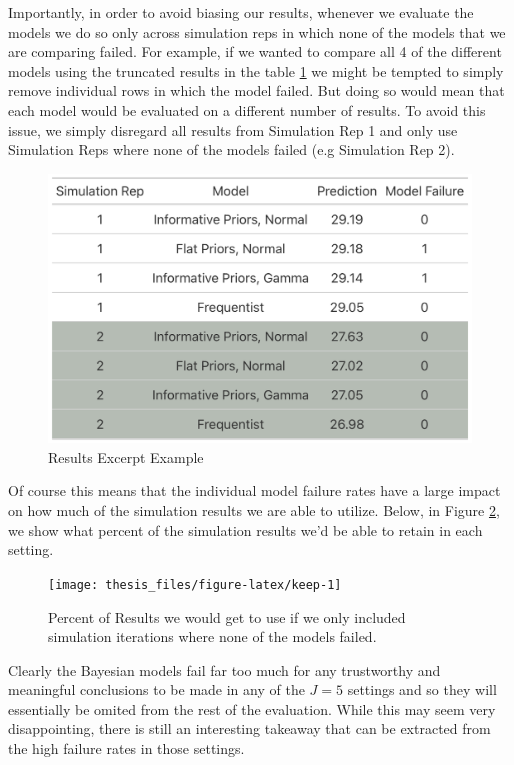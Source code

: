 \documentclass[12pt,twoside]{reedthesis}
\begin{document}
Importantly, in order to avoid biasing our results, whenever we evaluate the models we do so only across simulation reps in which none of the models that we are comparing failed. For example, if we wanted to compare all 4 of the different models using the truncated results in the table \ref{fig:tbl} we might be tempted to simply remove individual rows in which the model failed. But doing so would mean that each model would be evaluated on a different number of results. To avoid this issue, we simply disregard all results from Simulation Rep 1 and only use Simulation Reps where none of the models failed (e.g Simulation Rep 2).
\begin{figure}

{\centering \includegraphics[width=0.8\linewidth]{figure/tb1} 

}

\caption{Results Excerpt Example}\label{fig:tbl}
\end{figure}
Of course this means that the individual model failure rates have a large impact on how much of the simulation results we are able to utilize. Below, in Figure \ref{fig:keep}, we show what percent of the simulation results we'd be able to retain in each setting.
\begin{figure}

{\centering \texttt{[image: thesis\_files/figure-latex/keep-1]} 

}

\caption{Percent of Results we would get to use if we only included simulation iterations where none of the models failed.}\label{fig:keep}
\end{figure}
Clearly the Bayesian models fail far too much for any trustworthy and meaningful conclusions to be made in any of the \(J = 5\) settings and so they will essentially be omited from the rest of the evaluation. While this may seem very disappointing, there is still an interesting takeaway that can be extracted from the high failure rates in those settings.
\end{document}
